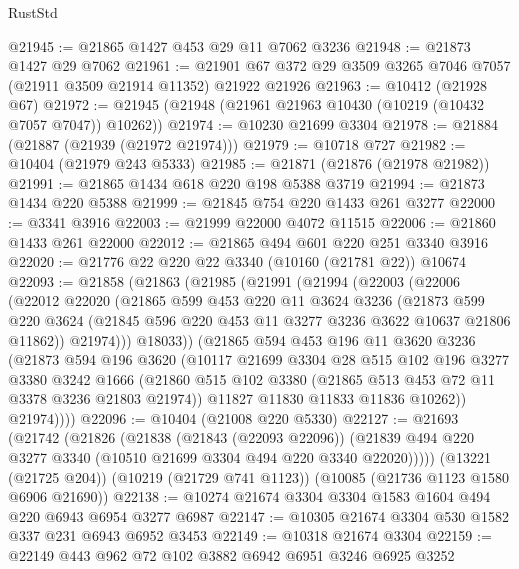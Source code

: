 \begin{lexlean}{RustStd}
\begin{coremodule}
@21945 := @21865 @1427 @453 @29 @11 @7062 @3236
@21948 := @21873 @1427 @29 @7062
@21961 := @21901 @67 @372 @29 @3509 @3265 @7046 @7057 (@21911 @3509 @21914 @11352) @21922 @21926
@21963 := @10412 (@21928 @67)
@21972 := @21945 (@21948 (@21961 @21963 @10430 (@10219 (@10432 @7057 @7047)) @10262))
@21974 := @10230 @21699 @3304
@21978 := @21884 (@21887 (@21939 (@21972 @21974)))
@21979 := @10718 @727
@21982 := @10404 (@21979 @243 @5333)
@21985 := @21871 (@21876 (@21978 @21982))
@21991 := @21865 @1434 @618 @220 @198 @5388 @3719
@21994 := @21873 @1434 @220 @5388
@21999 := @21845 @754 @220 @1433 @261 @3277
@22000 := @3341 @3916
@22003 := @21999 @22000 @4072 @11515
@22006 := @21860 @1433 @261 @22000
@22012 := @21865 @494 @601 @220 @251 @3340 @3916
@22020 := @21776 @22 @220 @22 @3340 (@10160 (@21781 @22)) @10674
@22093 := @21858
    (@21863
      (@21985
        (@21991
          (@21994
            (@22003
              (@22006
                (@22012
                  @22020
                  (@21865
                    @599
                    @453
                    @220
                    @11
                    @3624
                    @3236
                    (@21873
                      @599
                      @220
                      @3624
                      (@21845 @596 @220 @453 @11 @3277 @3236 @3622 @10637 @21806 @11862))
                    @21974)))
              @18033))
          (@21865
            @594
            @453
            @196
            @11
            @3620
            @3236
            (@21873
              @594
              @196
              @3620
              (@10117
                @21699
                @3304
                @28
                @515
                @102
                @196
                @3277
                @3380
                @3242
                @1666
                (@21860 @515 @102 @3380 (@21865 @513 @453 @72 @11 @3378 @3236 @21803 @21974))
                @11827
                @11830
                @11833
                @11836
                @10262))
            @21974))))
@22096 := @10404 (@21008 @220 @5330)
@22127 := @21693
    (@21742
      (@21826
        (@21838
          (@21843 (@22093 @22096))
          (@21839 @494 @220 @3277 @3340 (@10510 @21699 @3304 @494 @220 @3340 @22020)))))
    (@13221 (@21725 @204))
    (@10219 (@21729 @741 @1123))
    (@10085 (@21736 @1123 @1580 @6906 @21690))
@22138 := @10274 @21674 @3304 @3304 @1583 @1604 @494 @220 @6943 @6954 @3277 @6987
@22147 := @10305 @21674 @3304 @530 @1582 @337 @231 @6943 @6952 @3453
@22149 := @10318 @21674 @3304
@22159 := @22149 @443 @962 @72 @102 @3882 @6942 @6951 @3246 @6925 @3252

\end{coremodule}
\end{lexlean}
